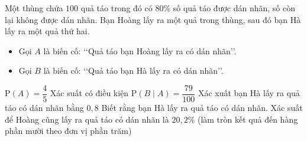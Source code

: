 \begin{ex}%
Một thùng chứa $100$ quả táo trong đó có $80\%$ số quả táo được dán nhãn, số còn lại không được dán nhãn. Bạn Hoàng lấy ra một quả trong thùng, sau đó bạn Hà lấy ra một quả thứ hai.
\begin{itemize}
\item Gọi $A$ là biến cố: \lq\lq Quả táo bạn Hoàng lấy ra có dán nhãn\rq\rq.
\item Gọi $B$ là biến cố: \lq\lq Quả táo bạn Hà lấy ra có dán nhãn\rq\rq.
\end{itemize}
\choiceTF
{\True $\mathrm{P}(A)=\dfrac{4}{5}$}
{Xác suất có điều kiện $\mathrm{P}(B\mid A)=\dfrac{79}{100}$}
{\True Xác xuất bạn Hà lấy ra quả táo có dán nhãn bằng $0{,}8$}
{Biết rằng bạn Hà lấy ra quả táo có dán nhãn. Xác suất để Hoàng cũng lấy ra quả táo có dán nhãn là $20{,}2\%$ (làm tròn kết quả đến hàng phần mười theo đơn vị phần trăm)}
\end{ex}

